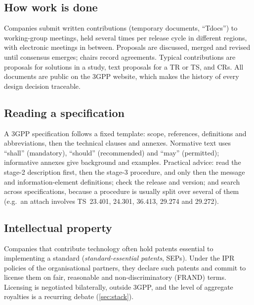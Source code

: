 \documentclass[11pt,a4paper]{article}
\begin{document}
\begin{acnfigure}
  \caption{From study item to specification, and the change-request cycle.}
  \label{fig:cr}
\end{acnfigure}

\subsection{How work is done}
Companies submit written contributions (temporary documents, ``Tdocs'') to working-group meetings, held several
times per release cycle in different regions, with electronic meetings in between. Proposals are discussed,
merged and revised until consensus emerges; chairs record agreements. Typical contributions are proposals for
solutions in a study, text proposals for a TR or TS, and CRs. All documents are public on the 3GPP website, which
makes the history of every design decision traceable.

\subsection{Reading a specification}
A 3GPP specification follows a fixed template: scope, references, definitions and abbreviations, then the
technical clauses and annexes. Normative text uses ``shall'' (mandatory), ``should'' (recommended) and ``may''
(permitted); informative annexes give background and examples. Practical advice: read the stage-2 description
first, then the stage-3 procedure, and only then the message and information-element definitions; check the
release and version; and search across specifications, because a procedure is usually split over several of
them (e.g.\ an attach involves TS~23.401, 24.301, 36.413, 29.274 and 29.272).

\subsection{Intellectual property}
Companies that contribute technology often hold patents essential to implementing a standard (\emph{standard-essential
patents}, SEPs). Under the IPR policies of the organisational partners, they declare such patents and commit to
license them on fair, reasonable and non-discriminatory (FRAND) terms. Licensing is negotiated bilaterally, outside
3GPP, and the level of aggregate royalties is a recurring debate (\cref{sec:stack}).

\end{document}
